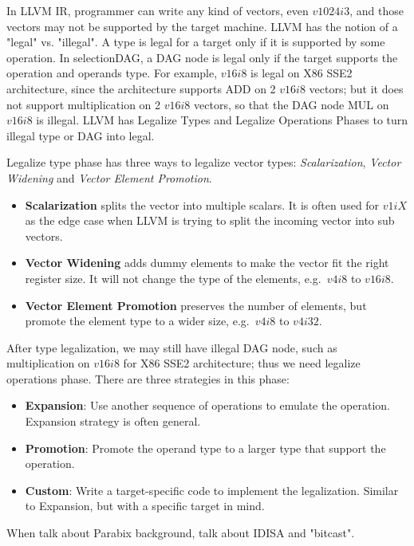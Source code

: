 In LLVM IR, programmer can write any kind of vectors, even $v1024i3$, and those vectors may not be supported by the target machine. LLVM has the notion of a "legal" vs. "illegal". A type is legal for a target only if it is supported by some operation. In selectionDAG, a DAG node is legal only if the target supports the operation and operands type. For example, $v16i8$ is legal on X86 SSE2 architecture, since the architecture supports ADD on 2 $v16i8$ vectors; but it does not support multiplication on 2 $v16i8$ vectors, so that the DAG node MUL on $v16i8$ is illegal. LLVM has Legalize Types and Legalize Operations Phases to turn illegal type or DAG into legal\cite{llvm_code_gen}.

Legalize type phase has three ways to legalize vector types\cite{hybrid_simd_type_legalize}: \textit{Scalarization}, \textit{Vector Widening} and \textit{Vector Element Promotion}.

\begin{itemize}
    \item \textbf{Scalarization} splits the vector into multiple scalars. It is often used for $v1iX$ as the edge case when LLVM is trying to split the incoming vector into sub vectors.
    \item \textbf{Vector Widening} adds dummy elements to make the vector fit the right register size. It will not change the type of the elements, e.g.\ $v4i8$ to $v16i8$.
    \item \textbf{Vector Element Promotion} preserves the number of elements, but promote the element type to a wider size, e.g.\ $v4i8$ to $v4i32$.
\end{itemize}

After type legalization, we may still have illegal DAG node, such as multiplication on $v16i8$ for X86 SSE2 architecture; thus we need legalize operations phase. There are three strategies in this phase:

\begin{itemize}
    \item \textbf{Expansion}: Use another sequence of operations to emulate the operation. Expansion strategy is often general.
    \item \textbf{Promotion}: Promote the operand type to a larger type that support the operation.
    \item \textbf{Custom}: Write a target-specific code to implement the legalization. Similar to Expansion, but with a specific target in mind.
\end{itemize}

When talk about Parabix background, talk about IDISA and "bitcast".
